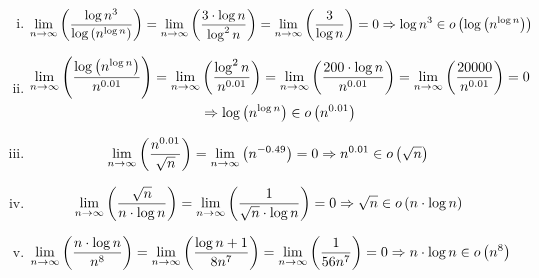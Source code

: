 \documentclass[a4paper]{scrartcl}
\begin{document}
\begin{enumerate}[(a)]
\begin{enumerate}[i.]
            \item
                \begin{equation*}
                    \lim_{n \to \infty} \left( \frac{\log n^3}{\log \left( n^{\log n} \right)} \right)
                    = \lim_{n \to \infty} \left( \frac{3 \cdot \log n}{\log^2 n} \right)
                    = \lim_{n \to \infty} \left( \frac{3}{\log n} \right)
                    = 0 \Rightarrow \log n^3 \in o \left( \log \left( n^{\log n} \right) \right)
                \end{equation*}

            \item
                \begin{equation*}
                    \begin{gathered}
                        \lim_{n \to \infty} \left( \frac{\log \left( n^{\log n} \right)}{n^{\num{0,01}}} \right)
                        = \lim_{n \to \infty} \left( \frac{\log^2 n}{n^{\num{0,01}}} \right)
                        = \lim_{n \to \infty} \left( \frac{200 \cdot \log n}{n^{\num{0,01}}} \right)
                        = \lim_{n \to \infty} \left( \frac{20000}{n^{\num{0,01}}} \right)
                        = 0 \\
                        \Rightarrow \log \left( n^{\log n} \right) \in o \left( n^{\num{0,01}} \right)
                    \end{gathered}
                \end{equation*}

            \item
                \begin{equation*}
                    \lim_{n \to \infty} \left( \frac{n^{\num{0,01}}}{\sqrt{n}} \right)
                    = \lim_{n \to \infty} \left( n^{\num{-0,49}} \right)
                    = 0
                    \Rightarrow n^{\num{0,01}} \in o \left( \sqrt{n} \right)
                \end{equation*}

            \item
                \begin{equation*}
                    \lim_{n \to \infty} \left( \frac{\sqrt{n}}{n \cdot \log n} \right)
                    = \lim_{n \to \infty} \left( \frac{1}{\sqrt{n} \cdot \log n} \right)
                    = 0
                    \Rightarrow \sqrt{n} \in o \left( n \cdot \log n \right)
                \end{equation*}

            \item
                \begin{equation*}
                    \lim_{n \to \infty} \left( \frac{n \cdot \log n}{n^8} \right)
                    = \lim_{n \to \infty} \left( \frac{\log n + 1}{8n^7} \right)
                    = \lim_{n \to \infty} \left( \frac{1}{56n^7} \right)
                    = 0
                    \Rightarrow n \cdot \log n \in o \left( n^8 \right)
                \end{equation*}


\end{enumerate}
\end{enumerate}
\end{document}
